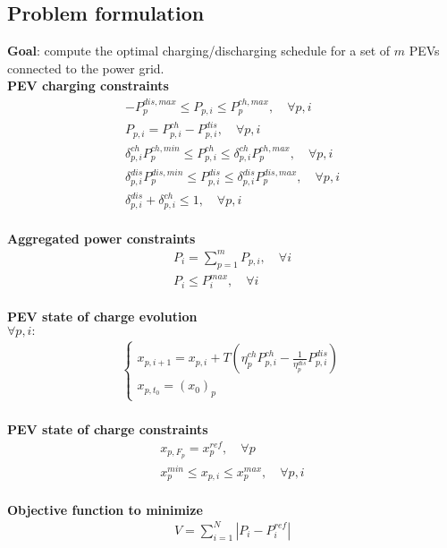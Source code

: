 \subsection{Problem formulation}
\textbf{Goal}: compute the optimal charging/discharging schedule for a set of $m$ PEVs connected to the power grid.
\\\textbf{PEV charging constraints}
\begin{gather}
    -P^{dis,max}_p \leq P_{p,i} \leq P^{ch,max}_p, \quad \forall p,i \label{constr:c1}\\
    P_{p,i} = P^{ch}_{p,i}-P^{dis}_{p,i}, \quad \forall p,i \\
    \delta^{ch}_{p,i} P^{ch,min}_p \leq P^{ch}_{p,i} \leq \delta^{ch}_{p,i} P^{ch,max}_p, \quad \forall p,i \\
    \delta^{dis}_{p,i} P^{dis,min}_p \leq P^{dis}_{p,i} \leq \delta^{dis}_{p,i} P^{dis,max}_p, \quad \forall p,i \\
    \delta^{dis}_{p,i} + \delta^{ch}_{p,i} \leq 1, \quad \forall p,i \label{constr:c5}
\end{gather}
\\\textbf{Aggregated power constraints}
\begin{gather}
    P_i = \sum_{p=1}^m P_{p,i}, \quad \forall i \\
    P_i \leq P^{max}_i, \quad \forall i \label{constr:c7}
\end{gather}
\\\textbf{PEV state of charge evolution}\\
$\forall p,i:$
\begin{align}
    \begin{cases}
        x_{p,i+1} = x_{p,i} + T (\eta^{ch}_p P^{ch}_{p,i} - \frac{1}{\eta^{dis}_p} P^{dis}_{p,i}) \label{constr:c8}\\
        x_{p,t_0} = (x_0)_p
    \end{cases}
\end{align}
\\\textbf{PEV state of charge constraints}
\begin{gather}
    x_{p, F_p} = x^{ref}_p, \quad \forall p \\
    x^{min}_p \leq x_{p,i} \leq x^{max}_p, \quad \forall p,i \label{constr:c10}
\end{gather}
\\\textbf{Objective function to minimize} \\
\begin{align}
    V = \sum_{i=1}^{N} |P_i - P^{ref}_i|
\end{align}
